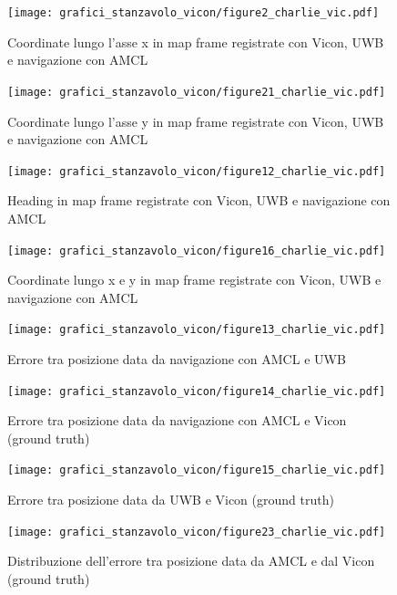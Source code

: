 \begin{figure}[] 
	\centering    
	\texttt{[image: grafici\_stanzavolo\_vicon/figure2\_charlie\_vic.pdf]}
	\caption{Coordinate lungo l'asse x in map frame registrate con Vicon, UWB e navigazione con AMCL}
	\label{fig: asse_x_vicon_charlie}
\end{figure}

\begin{figure}[] 
	\centering    
	\texttt{[image: grafici\_stanzavolo\_vicon/figure21\_charlie\_vic.pdf]}
	\caption{Coordinate lungo l'asse y in map frame registrate con Vicon, UWB e navigazione con AMCL}
	\label{fig: asse_y_vicon_charlie}
\end{figure}

\begin{figure}[] 
	\centering    
	\texttt{[image: grafici\_stanzavolo\_vicon/figure12\_charlie\_vic.pdf]}
	\caption{Heading in map frame registrate con Vicon, UWB e navigazione con AMCL}
	\label{fig: heading_vicon_charlie}
\end{figure}

\begin{figure}[] 
	\centering    
	\texttt{[image: grafici\_stanzavolo\_vicon/figure16\_charlie\_vic.pdf]}
	\caption{Coordinate lungo x e y in map frame registrate con Vicon, UWB e navigazione con AMCL}
	\label{fig: assixy_vicon_charlie}
\end{figure}

\begin{figure}[] 
	\centering    
	\texttt{[image: grafici\_stanzavolo\_vicon/figure13\_charlie\_vic.pdf]}
	\caption{Errore tra posizione data da navigazione con AMCL e UWB}
	\label{fig: amcluwb_err_vicon_charlie}
\end{figure}

\begin{figure}[] 
	\centering    
	\texttt{[image: grafici\_stanzavolo\_vicon/figure14\_charlie\_vic.pdf]}
	\caption{Errore tra posizione data da navigazione con AMCL e Vicon (ground truth)}
	\label{fig: amclvic_err_vicon_charlie}
\end{figure}

\begin{figure}[] 
	\centering    
	\texttt{[image: grafici\_stanzavolo\_vicon/figure15\_charlie\_vic.pdf]}
	\caption{Errore tra posizione data da UWB e Vicon (ground truth)}
	\label{fig: uwbvic_err_vicon_charlie}
\end{figure}

\begin{figure}[] 
	\centering    
	\texttt{[image: grafici\_stanzavolo\_vicon/figure23\_charlie\_vic.pdf]}
	\caption{Distribuzione dell'errore tra posizione data da AMCL e dal Vicon (ground truth) }
	\label{fig: err_amclvic_sphere_vicon_charlie}
\end{figure}


